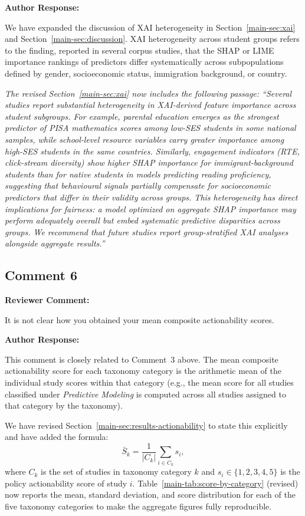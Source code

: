 \documentclass[12pt, a4paper]{article}
\newcommand{\R}[1]{Section~\ref{main-#1}}
\newcommand{\Rt}[1]{Table~\ref{main-#1}}
\newenvironment{reviewercomment}{%
  \begin{mdframed}[linecolor=reviewercolor, linewidth=1.5pt,
    backgroundcolor=reviewercolor!6, innertopmargin=8pt, innerbottommargin=8pt]
  \color{reviewercolor}\textbf{Reviewer Comment:}\normalcolor\par\smallskip
}{%
  \end{mdframed}\medskip
}
\newenvironment{authorresponse}{%
  \begin{mdframed}[linecolor=authorcolor, linewidth=1pt,
    backgroundcolor=authorcolor!5, innertopmargin=8pt, innerbottommargin=8pt]
  \color{authorcolor}\textbf{Author Response:}\normalcolor\par\smallskip
}{%
  \end{mdframed}\bigskip
}
\newcommand{\changed}[1]{\textcolor{changedcolor}{\textit{#1}}}
\begin{document}
\begin{authorresponse}
We have expanded the discussion of XAI heterogeneity in \R{sec:xai} and
\R{sec:discussion}. XAI heterogeneity across student groups refers to
the finding, reported in several corpus studies, that the SHAP or LIME
importance rankings of predictors differ systematically across
subpopulations defined by gender, socioeconomic status, immigration
background, or country.

\changed{The revised \R{sec:xai} now includes the following passage:
``Several studies report substantial heterogeneity in XAI-derived feature
importance across student subgroups. For example, parental education
emerges as the strongest predictor of PISA mathematics scores among
low-SES students in some national samples, while school-level resource
variables carry greater importance among high-SES students in the same
countries. Similarly, engagement indicators (RTE, click-stream diversity)
show higher SHAP importance for immigrant-background students than for
native students in models predicting reading proficiency, suggesting that
behavioural signals partially compensate for socioeconomic predictors that
differ in their validity across groups. This heterogeneity has direct
implications for fairness: a model optimized on aggregate SHAP importance
may perform adequately overall but embed systematic predictive disparities
across groups. We recommend that future studies report group-stratified
XAI analyses alongside aggregate results.''}
\end{authorresponse}

\subsection*{Comment 6}

\begin{reviewercomment}
It is not clear how you obtained your mean composite actionability scores.
\end{reviewercomment}

\begin{authorresponse}
This comment is closely related to Comment~3 above. The mean composite
actionability score for each taxonomy category is the arithmetic mean of
the individual study scores within that category (e.g., the mean score for
all studies classified under \textit{Predictive Modeling} is computed
across all studies assigned to that category by the taxonomy).

We have revised \R{sec:results-actionability} to state this explicitly and
have added the formula:
\[
  \bar{S}_k = \frac{1}{|C_k|} \sum_{i \in C_k} s_i,
\]
where $C_k$ is the set of studies in taxonomy category $k$ and $s_i \in
\{1,2,3,4,5\}$ is the policy actionability score of study $i$.
\Rt{tab:score-by-category} (revised) now reports the mean, standard
deviation, and score distribution for each of the five taxonomy categories
to make the aggregate figures fully reproducible.
\end{authorresponse}
\end{document}

